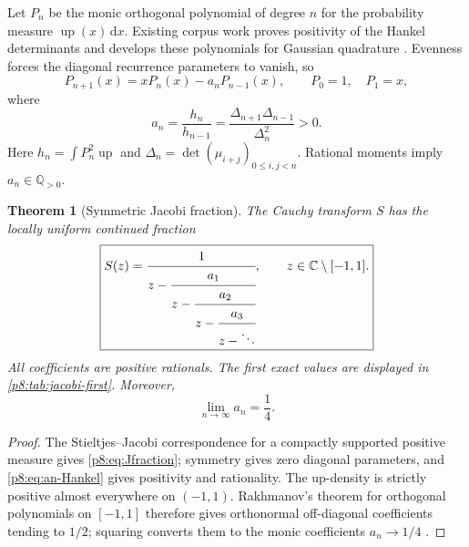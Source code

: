 \documentclass[11pt,oneside]{article}
\newtheorem{theorem}{Theorem}[section]
\theoremstyle{definition}
\theoremstyle{remark}
\newcommand{\Up}{\operatorname{up}}
\newcommand{\C}{\mathbb C}
\newcommand{\dd}{\,\mathrm d}
\newcommand{\1}{\mathbf 1}
\begin{document}
Let \(P_n\) be the monic orthogonal polynomial of degree \(n\) for the
probability measure \(\Up(x)\dd x\).  Existing corpus work proves positivity of
the Hankel determinants and develops these polynomials for Gaussian quadrature
\cite{p8:proveitQuadrature}.  Evenness forces the diagonal recurrence parameters
to vanish, so
\begin{equation}
 P_{n+1}(x)=xP_n(x)-a_nP_{n-1}(x),
 \qquad P_0=1,\quad P_1=x,
 \label{p8:eq:monic-recurrence}
\end{equation}
where
\begin{equation}
 a_n=\frac{h_n}{h_{n-1}}
 =\frac{\Delta_{n+1}\Delta_{n-1}}{\Delta_n^2}>0.
 \label{p8:eq:an-Hankel}
\end{equation}
Here \(h_n=\int P_n^2\Up\) and
\(\Delta_n=\det(\mu_{i+j})_{0\le i,j<n}\).  Rational moments imply
\(a_n\in\mathbb Q_{>0}\).

\begin{theorem}[Symmetric Jacobi fraction]
\label{p8:thm:Jfraction}
The Cauchy transform \(S\) has the locally uniform continued fraction
\begin{equation}
 \boxed{
 S(z)=\cfrac{1}{z-\cfrac{a_1}{z-\cfrac{a_2}{z-\cfrac{a_3}{z-\ddots}}}},
 \qquad z\in\C\setminus[-1,1].}
 \label{p8:eq:Jfraction}
\end{equation}
All coefficients are positive rationals.  The first exact values are displayed
in \cref{p8:tab:jacobi-first}.  Moreover,
\begin{equation}
 \boxed{\lim_{n\to\infty}a_n=\frac14.}
 \label{p8:eq:an-limit}
\end{equation}
\statusprovedPartll
\end{theorem}

\begin{proof}
The Stieltjes--Jacobi correspondence for a compactly supported positive measure
gives \eqref{p8:eq:Jfraction}; symmetry gives zero diagonal parameters, and
\eqref{p8:eq:an-Hankel} gives positivity and rationality.  The up-density is
strictly positive almost everywhere on \((-1,1)\).  Rakhmanov's theorem for
orthogonal polynomials on \([-1,1]\) therefore gives orthonormal off-diagonal
coefficients tending to \(1/2\); squaring converts them to the monic
coefficients \(a_n\to1/4\) \cite{p8:simonSzego}.
\end{proof}

\begin{table}[htbp]
\centering
\caption{First Jacobi coefficients of the monic up-polynomials, computed by
exact rational Gram--Schmidt.}
\label{p8:tab:jacobi-first}

\end{table}
\end{document}
